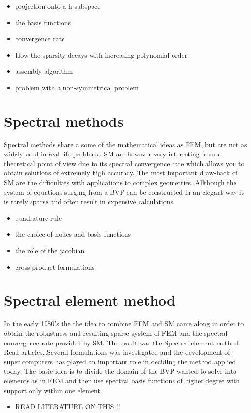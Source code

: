 \begin{itemize}
\item projection onto a h-subspace
\item the basis functions
\item convergence rate
\item How the sparsity decays with increasing polynomial order
\item assembly algorithm
\item problem with a non-symmetrical problem
\end{itemize}

\section{Spectral methods}
Spectral methods share a some of the mathematical ideas as FEM, but are not as widely used in real life problems. SM are however very 
interesting from a theoretical point of view due to its spectral convergence rate which allows you to obtain solutions of extremely high accuracy. 
The most important draw-back of SM are the difficulties with applications to complex geometries. Allthough the system of equations surging from
a BVP can be constructed in an elegant way it is rarely sparse and often result in expensive calculations. 

\begin{itemize}
\item quadrature rule
\item the choice of nodes and basis functions
\item the role of the jacobian 
\item cross product formulations
\end{itemize}

\cite{Canuto}


\section{Spectral element method}
In the early 1980's the the idea to combine FEM and SM came along in order to obtain the robustness and resulting sparse system of FEM and the
spectral convergence rate provided by SM. The result was the Spectral element method. Read articles\ldots Several formulations was investigated  and the development of super computers has played an important role in deciding the method applied today. The basic idea is to divide the domain 
of the BVP wanted to solve into elements as in FEM and then use spectral basis functions of higher degree with support only within one element. 

\begin{itemize}
\item READ LITERATURE ON THIS !! 
\end{itemize}


